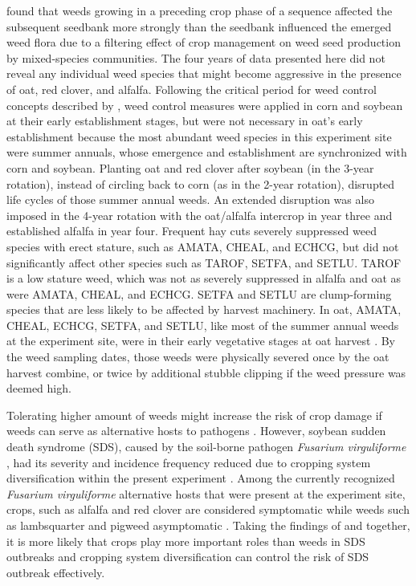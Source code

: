 \documentclass[
]{article}
\begin{document}
\citet{ryanManagementFiltersSpecies2010} found that weeds growing in a preceding crop phase of a sequence affected the subsequent seedbank more strongly than the seedbank influenced the emerged weed flora due to a filtering effect of crop management on weed seed production by mixed-species communities. The four years of data presented here did not reveal any individual weed species that might become aggressive in the presence of oat, red clover, and alfalfa. Following the critical period for weed control concepts described by \citet{knezevicCriticalPeriodWeed2002}, weed control measures were applied in corn and soybean at their early establishment stages, but were not necessary in oat's early establishment because the most abundant weed species in this experiment site were summer annuals, whose emergence and establishment are synchronized with corn and soybean. Planting oat and red clover after soybean (in the 3-year rotation), instead of circling back to corn (as in the 2-year rotation), disrupted life cycles of those summer annual weeds. An extended disruption was also imposed in the 4-year rotation with the oat/alfalfa intercrop in year three and established alfalfa in year four. Frequent hay cuts severely suppressed weed species with erect stature, such as AMATA, CHEAL, and ECHCG, but did not significantly affect other species such as TAROF, SETFA, and SETLU. TAROF is a low stature weed, which was not as severely suppressed in alfalfa and oat as were AMATA, CHEAL, and ECHCG. SETFA and SETLU are clump-forming species that are less likely to be affected by harvest machinery. In oat, AMATA, CHEAL, ECHCG, SETFA, and SETLU, like most of the summer annual weeds at the experiment site, were in their early vegetative stages at oat harvest \citep{buhlerEmergencePersistenceSeed2001, cordeauHowWeedsDiffer2017}. By the weed sampling dates, those weeds were physically severed once by the oat harvest combine, or twice by additional stubble clipping if the weed pressure was deemed high.

Tolerating higher amount of weeds might increase the risk of crop damage if weeds can serve as alternative hosts to pathogens \citep{wislerInteractionsWeedsCultivated2005, mohlerCropDiseasePathogens2009}. However, soybean sudden death syndrome (SDS), caused by the soil-borne pathogen \emph{Fusarium virguliforme} \citep{hartmanResearchAdvancesManagement2015}, had its severity and incidence frequency reduced due to cropping system diversification within the present experiment \citep{leandroCroppingSystemDiversification2018}. Among the currently recognized \emph{Fusarium virguliforme} alternative hosts that were present at the experiment site, crops, such as alfalfa and red clover are considered symptomatic while weeds such as lambsquarter and pigweed asymptomatic \citep{kolanderSymptomaticAsymptomaticHost2012}. Taking the findings of \citet{kolanderSymptomaticAsymptomaticHost2012} and \citet{leandroCroppingSystemDiversification2018} together, it is more likely that crops play more important roles than weeds in SDS outbreaks and cropping system diversification can control the risk of SDS outbreak effectively.
\end{document}
